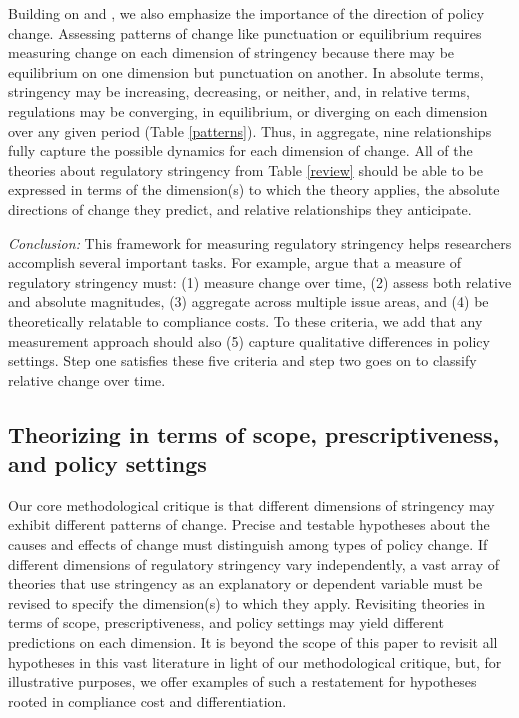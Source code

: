 \documentclass[
      12pt,
            Review ]{article}
\begin{document}
Building on \citet{Baumgartner2002} and \citet{Howlett2007}, we also
emphasize the importance of the direction of policy change. Assessing
patterns of change like punctuation or equilibrium requires measuring
change on each dimension of stringency because there may be equilibrium
on one dimension but punctuation on another. In absolute terms,
stringency may be increasing, decreasing, or neither, and, in relative
terms, regulations may be converging, in equilibrium, or diverging on
each dimension over any given period (Table \ref{patterns}). Thus, in
aggregate, nine relationships fully capture the possible dynamics for
each dimension of change. All of the theories about regulatory
stringency from Table \ref{review} should be able to be expressed in
terms of the dimension(s) to which the theory applies, the absolute
directions of change they predict, and relative relationships they
anticipate.



\emph{Conclusion:} This framework for measuring regulatory stringency
helps researchers accomplish several important tasks. For example,
\citet{Brunel2016} argue that a measure of regulatory stringency must:
(1) measure change over time, (2) assess both relative and absolute
magnitudes, (3) aggregate across multiple issue areas, and (4) be
theoretically relatable to compliance costs. To these criteria, we add
that any measurement approach should also (5) capture qualitative
differences in policy settings. Step one satisfies these five criteria
and step two goes on to classify relative change over time.

\subsection{Theorizing in terms of scope, prescriptiveness, and policy
settings}\label{theorizing-in-terms-of-scope-prescriptiveness-and-policy-settings}

Our core methodological critique is that different dimensions of
stringency may exhibit different patterns of change. Precise and
testable hypotheses about the causes and effects of change must
distinguish among types of policy change. If different dimensions of
regulatory stringency vary independently, a vast array of theories that
use stringency as an explanatory or dependent variable must be revised
to specify the dimension(s) to which they apply. Revisiting theories in
terms of scope, prescriptiveness, and policy settings may yield
different predictions on each dimension. It is beyond the scope of this
paper to revisit all hypotheses in this vast literature in light of our
methodological critique, but, for illustrative purposes, we offer
examples of such a restatement for hypotheses rooted in compliance cost
and differentiation.
\end{document}
